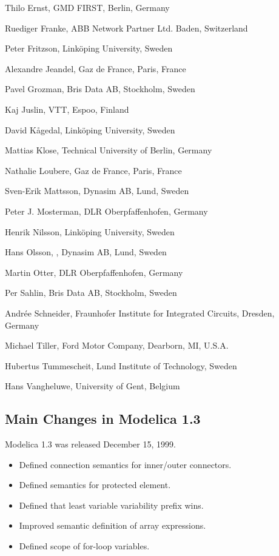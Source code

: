 \documentclass[10pt,a4paper]{report}
\def\doublelabel#1{\label{#1}\hypertarget{#1}{}}
\begin{document}
Thilo Ernst, GMD FIRST, Berlin, Germany

Ruediger Franke, ABB Network Partner Ltd. Baden, Switzerland

Peter Fritzson, Linköping University, Sweden

Alexandre Jeandel, Gaz de France, Paris, France

Pavel Grozman, Bris Data AB, Stockholm, Sweden

Kaj Juslin, VTT, Espoo, Finland

David Kågedal, Linköping University, Sweden

Mattias Klose, Technical University of Berlin, Germany

Nathalie Loubere, Gaz de France, Paris, France

Sven-Erik Mattsson, Dynasim AB, Lund, Sweden

Peter J. Mosterman, DLR Oberpfaffenhofen, Germany

Henrik Nilsson, Linköping University, Sweden

Hans Olsson, , Dynasim AB, Lund, Sweden

Martin Otter, DLR Oberpfaffenhofen, Germany

Per Sahlin, Bris Data AB, Stockholm, Sweden

Andrée Schneider, Fraunhofer Institute for Integrated Circuits, Dresden,
Germany

Michael Tiller, Ford Motor Company, Dearborn, MI, U.S.A.

Hubertus Tummescheit, Lund Institute of Technology, Sweden

Hans Vangheluwe, University of Gent, Belgium

\subsection{Main Changes in Modelica 1.3}\doublelabel{main-changes-in-modelica-1-3}

Modelica 1.3 was released December 15, 1999.

\begin{itemize}
\item
  Defined connection semantics for inner/outer connectors.
\item
  Defined semantics for protected element.
\item
  Defined that least variable variability prefix wins.
\item
  Improved semantic definition of array expressions.
\item
  Defined scope of for-loop variables.
\end{itemize}
\end{document}
